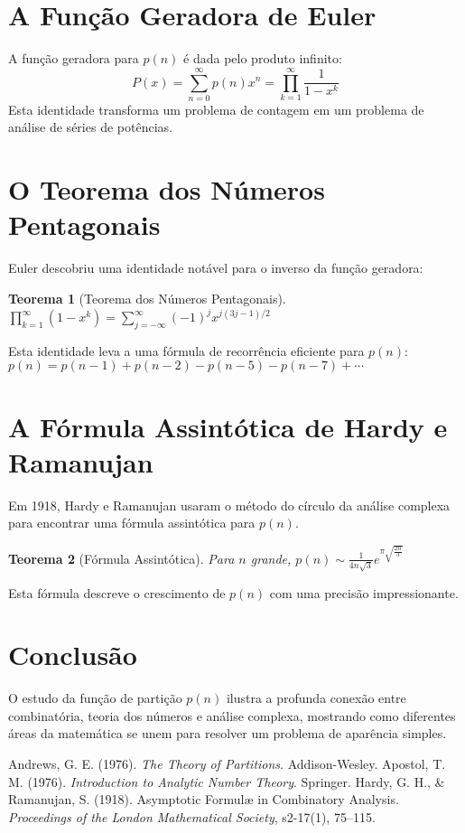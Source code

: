 \documentclass[12pt, a4paper]{article}
\newtheorem{theorem}{Teorema}[section]
\theoremstyle{definition}
\theoremstyle{remark}
\begin{document}
\section{A Função Geradora de Euler}
A função geradora para $p(n)$ é dada pelo produto infinito:
\begin{equation}
P(x) = \sum_{n=0}^{\infty} p(n)x^n = \prod_{k=1}^{\infty} \frac{1}{1-x^k}
\end{equation}
Esta identidade transforma um problema de contagem em um problema de análise de séries de potências.

\section{O Teorema dos Números Pentagonais}
Euler descobriu uma identidade notável para o inverso da função geradora:
\begin{theorem}[Teorema dos Números Pentagonais]
$\prod_{k=1}^{\infty} (1-x^k) = \sum_{j=-\infty}^{\infty} (-1)^j x^{j(3j-1)/2}$
\end{theorem}
Esta identidade leva a uma fórmula de recorrência eficiente para $p(n)$:
$p(n) = p(n-1) + p(n-2) - p(n-5) - p(n-7) + \cdots$

\section{A Fórmula Assintótica de Hardy e Ramanujan}
Em 1918, Hardy e Ramanujan usaram o método do círculo da análise complexa para encontrar uma fórmula assintótica para $p(n)$.
\begin{theorem}[Fórmula Assintótica]
Para $n$ grande, $p(n) \sim \frac{1}{4n\sqrt{3}} e^{\pi \sqrt{\frac{2n}{3}}}$
\end{theorem}
Esta fórmula descreve o crescimento de $p(n)$ com uma precisão impressionante.

\section{Conclusão}
O estudo da função de partição $p(n)$ ilustra a profunda conexão entre combinatória, teoria dos números e análise complexa, mostrando como diferentes áreas da matemática se unem para resolver um problema de aparência simples.

\begin{thebibliography}{9}
 Andrews, G. E. (1976). \textit{The Theory of Partitions}. Addison-Wesley.
 Apostol, T. M. (1976). \textit{Introduction to Analytic Number Theory}. Springer.
 Hardy, G. H., \& Ramanujan, S. (1918). Asymptotic Formulæ in Combinatory Analysis. \textit{Proceedings of the London Mathematical Society}, s2-17(1), 75–115.
\end{thebibliography}
\end{document}
